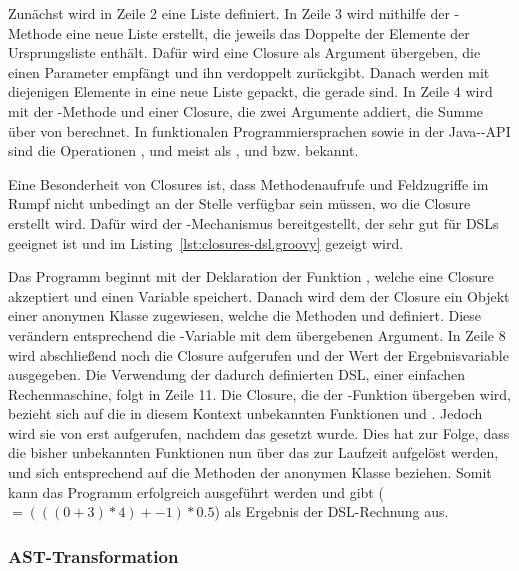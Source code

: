 
Zunächst wird in Zeile 2 eine Liste definiert.
In Zeile 3 wird mithilfe der -Methode eine neue Liste erstellt, die jeweils das Doppelte der Elemente der Ursprungsliste enthält.
Dafür wird eine Closure als Argument übergeben, die einen Parameter  empfängt und ihn verdoppelt zurückgibt.
Danach werden mit  diejenigen Elemente in eine neue Liste gepackt, die gerade sind.
In Zeile 4 wird mit der -Methode und einer Closure, die zwei Argumente addiert, die Summe über von  berechnet.
In funktionalen Programmiersprachen sowie in der Java--API sind die Operationen ,  und  meist als ,  und  bzw.  bekannt.

Eine Besonderheit von Closures ist, dass Methodenaufrufe und Feldzugriffe im Rumpf nicht unbedingt an der Stelle verfügbar sein müssen, wo die Closure erstellt wird.
Dafür wird der -Mechanismus bereitgestellt, der sehr gut für DSLs geeignet ist und im Listing~\ref{lst:closures-dsl.groovy} gezeigt wird.


Das Programm beginnt mit der Deklaration der Funktion , welche eine Closure akzeptiert und einen Variable  speichert.
Danach wird dem  der Closure ein Objekt einer anonymen Klasse zugewiesen, welche die Methoden  und  definiert.
Diese verändern entsprechend die -Variable mit dem übergebenen Argument.
In Zeile 8 wird abschließend noch die Closure aufgerufen und der Wert der Ergebnisvariable ausgegeben.
Die Verwendung der dadurch definierten DSL, einer einfachen Rechenmaschine, folgt in Zeile 11.
Die Closure, die der -Funktion übergeben wird, bezieht sich auf die in diesem Kontext unbekannten Funktionen  und .
Jedoch wird sie von  erst aufgerufen, nachdem das  gesetzt wurde.
Dies hat zur Folge, dass die bisher unbekannten Funktionen nun über das  zur Laufzeit aufgelöst werden, und sich entsprechend auf die Methoden der anonymen Klasse beziehen.
Somit kann das Programm erfolgreich ausgeführt werden und gibt  ($=(((0+3)*4)+-1)*0.5$) als Ergebnis der DSL-Rechnung aus.

\subsubsection{AST-Transformation}

